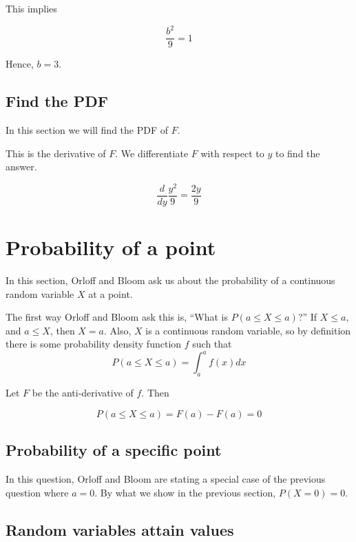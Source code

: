 \documentclass[a4paper,11pt]{article}
\begin{document}
This implies


\begin{equation}
  \frac{b^{2}}{9} = 1
\end{equation}

Hence, $b = 3$.

\subsection{Find the PDF}

In this section we will find the PDF of $F$.

This is the derivative of $F$.  We differentiate $F$ with respect to $y$ to
find the answer.

\begin{equation}
  \frac{d}{dy} \frac{y^2}{9} = \frac{2 y}{9}
\end{equation}

\section{Probability of a point}
In this section, Orloff and Bloom ask us about the probability of a
continuous random variable $X$ at a point.

The first way Orloff and Bloom ask this is,
``What is $P \left( a \leq X \leq a \right)$?''  If $X \leq a$, and $a \leq X$,
then $X=a$. Also, $X$ is a continuous random variable, so by definition
\cite{reading5b} there is some probability density function $f$ such that
\begin{equation}
  P \left(a \leq X \leq a \right) = \int_{a}^{a} f\left(x \right) dx
\end{equation}

Let $F$ be the anti-derivative of $f$.  Then

\begin{equation}
  P \left(a \leq X \leq a \right) = F \left(a \right)  - F \left( a \right) = 0
\end{equation}

\subsection{ Probability of a specific point}
In this question, Orloff and Bloom are stating a special case of the previous
question where $a=0$.   By what we show in the previous section,
$P\left(X=0 \right) = 0$.

\subsection{Random variables attain values}
\end{document}
